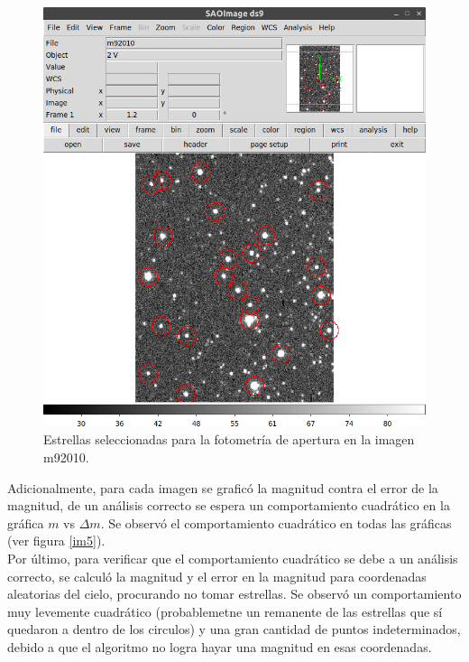\documentclass[12pt]{article}
\begin{document}
\begin{figure}[H]
   \includegraphics[scale=0.4]{imagenes.png}
  \caption{Estrellas seleccionadas para la fotometría de apertura en la imagen m92010.}
  \label{im4}
\end{figure}

Adicionalmente, para cada imagen se graficó la magnitud contra el error de la magnitud, de un análisis correcto se espera un comportamiento cuadrático en la gráfica $m$ vs $\Delta m $. Se observó el comportamiento cuadrático en todas las gráficas (ver figura \ref{im5}).\\


Por último, para verificar que el comportamiento cuadrático se debe a un análisis correcto, se calculó la magnitud y el error en la magnitud para coordenadas aleatorias del cielo, procurando no tomar estrellas. Se observó un comportamiento muy levemente cuadrático (probablemetne un remanente de las estrellas que sí quedaron a dentro de los circulos) y una gran cantidad de puntos indeterminados, debido a que el algoritmo no logra hayar una magnitud en esas coordenadas.
\end{document}
